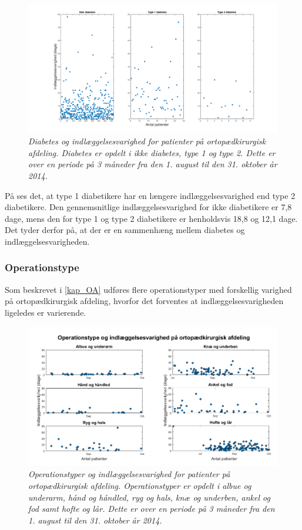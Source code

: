 \begin{figure}[H]
	\centering
	\includegraphics[scale=0.25]{figures/diabetesogindlaeg}
	\caption{\textit{Diabetes og indlæggelsesvarighed for patienter på ortopædkirurgisk afdeling. Diabetes er opdelt i ikke diabetes, type 1 og type 2. Dette er over en periode på 3 måneder fra den 1. august til den 31. oktober år 2014. }}
	\label{diabetesogindlaeggelse}
\end{figure}

\noindent
På  ses det, at type 1 diabetikere har en længere indlæggelsesvarighed end type 2 diabetikere. Den gennemsnitlige indlæggelsesvarighed for ikke diabetikere er 7,8 dage, mens den for type 1 og type 2 diabetikere er henholdsvis 18,8 og 12,1 dage. Det tyder derfor på, at der er en sammenhæng mellem diabetes og indlæggelsesvarigheden. 


\subsubsection{Operationstype}
Som beskrevet i \ref{kap_OA} udføres flere operationstyper med forskellig varighed på ortopædkirurgisk afdeling, hvorfor det forventes at indlæggelsesvarigheden ligeledes er varierende. 


\begin{figure}[H]
	\centering
	\includegraphics[scale=0.5]{figures/operaogindlaeg}
	\caption{\textit{Operationstyper og indlæggelsesvarighed for patienter på ortopædkirurgisk afdeling. Operationstyper er opdelt i albue og underarm, hånd og håndled, ryg og hals, knæ og underben, ankel og fod samt hofte og lår. Dette er over en periode på 3 måneder fra den 1. august til den 31. oktober år 2014.}}
	\label{opvsindlaegtid}
\end{figure}


